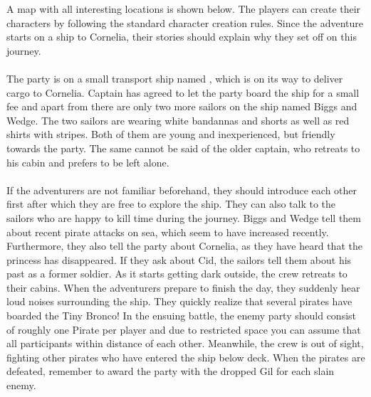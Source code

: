 A map with all interesting locations is shown below.
The players can create their characters by following the standard character creation rules.
Since the adventure starts on a ship to Cornelia, their stories should explain why they set off on this journey.
%
\ofpar
%
\\\\
%
The party is on a small transport ship named , which is on its way to deliver cargo to Cornelia.
Captain has agreed to let the party board the ship for a small fee and apart from there are only two more sailors on the ship named Biggs and Wedge.
The two sailors are wearing white bandannas and shorts as well as red shirts with stripes. 
Both of them are young and inexperienced, but friendly towards the party.
The same cannot be said of the older captain, who retreats to his cabin and prefers to be left alone.
%
\ofpar
%
\\\\
%
If the adventurers are not familiar beforehand, they should introduce each other first after which they are free to explore the ship.
They can also talk to the sailors who are happy to kill time during the journey.
Biggs and Wedge tell them about recent pirate attacks on sea, which seem to have increased recently.
Furthermore, they also tell the party about Cornelia, as they have heard that the princess has disappeared.
If they ask about Cid, the sailors tell them about his past as a former soldier. 
As it starts getting dark outside, the crew retreats to their cabins.
When the adventurers prepare to finish the day, they suddenly hear loud noises surrounding the ship.
They quickly realize that several pirates have boarded the Tiny Bronco!
In the ensuing battle, the enemy party should consist of roughly one Pirate per player and due to restricted space 
you can assume that all participants within distance of each other.
Meanwhile, the crew is out of sight, fighting other pirates who have entered the ship below deck.
When the pirates are defeated, remember to award the party with the dropped Gil for each slain enemy.
%
\vfill
%
